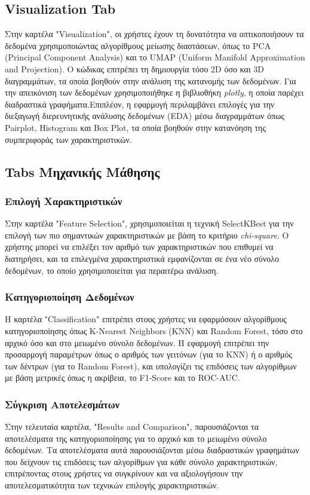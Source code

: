 \documentclass[a4paper,12pt]{article}
\begin{document}
\subsection{Visualization Tab}
Στην καρτέλα "Visualization", οι χρήστες έχουν τη δυνατότητα να οπτικοποιήσουν τα δεδομένα χρησιμοποιώντας αλγορίθμους μείωσης διαστάσεων, όπως το PCA (Principal Component Analysis) και το UMAP (Uniform Manifold Approximation and Projection). Ο κώδικας επιτρέπει τη δημιουργία τόσο 2D όσο και 3D διαγραμμάτων, τα οποία βοηθούν στην ανάλυση της κατανομής των δεδομένων. Για την απεικόνιση των δεδομένων χρησιμοποιήθηκε η βιβλιοθήκη \textit{plotly}, η οποία παρέχει διαδραστικά γραφήματα.Επιπλέον, η εφαρμογή περιλαμβάνει επιλογές για την διεξαγωγή διερευνητικής ανάλυσης δεδομένων (EDA) μέσω διαγραμμάτων όπως Pairplot, Histogram και Box Plot, τα οποία βοηθούν στην κατανόηση της συμπεριφοράς των χαρακτηριστικών.

\subsection{Tabs Μηχανικής Μάθησης}

\subsubsection{Επιλογή Χαρακτηριστικών}
Στην καρτέλα "Feature Selection", χρησιμοποιείται η τεχνική SelectKBest για την επιλογή των πιο σημαντικών χαρακτηριστικών με βάση το κριτήριο \textit{chi-square}. Ο χρήστης μπορεί να επιλέξει τον αριθμό των χαρακτηριστικών που επιθυμεί να διατηρήσει, και τα επιλεγμένα χαρακτηριστικά εμφανίζονται σε ένα νέο σύνολο δεδομένων, το οποίο χρησιμοποιείται για περαιτέρω ανάλυση.

\subsubsection{Κατηγοριοποίηση Δεδομένων}
Η καρτέλα "Classification" επιτρέπει στους χρήστες να εφαρμόσουν αλγορίθμους κατηγοριοποίησης όπως K-Nearest Neighbors (KNN) και Random Forest, τόσο στο αρχικό όσο και στο μειωμένο σύνολο δεδομένων. Η εφαρμογή επιτρέπει την προσαρμογή παραμέτρων όπως ο αριθμός των γειτόνων (για το KNN) ή ο αριθμός των δέντρων (για το Random Forest), και υπολογίζει τις επιδόσεις των αλγορίθμων με βάση μετρικές όπως η ακρίβεια, το F1-Score και το ROC-AUC.

\subsubsection{Σύγκριση Αποτελεσμάτων}
Στην τελευταία καρτέλα, "Results and Comparison", παρουσιάζονται τα αποτελέσματα της κατηγοριοποίησης για το αρχικό και το μειωμένο σύνολο δεδομένων. Τα αποτελέσματα αυτά παρουσιάζονται μέσω διαδραστικών γραφημάτων που δείχνουν τις επιδόσεις των αλγορίθμων για κάθε σύνολο χαρακτηριστικών, επιτρέποντας στους χρήστες να συγκρίνουν και να αξιολογήσουν την αποτελεσματικότητα των τεχνικών επιλογής χαρακτηριστικών.
\end{document}
